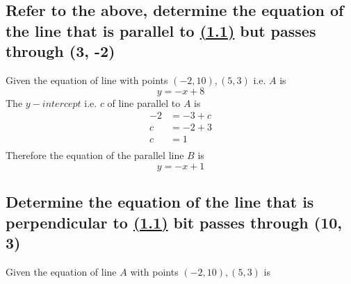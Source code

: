 \documentclass{article}
\begin{document}
\subsection{Refer to the above, determine the equation of the line that is parallel to \hyperref[subsection:1.1]{(1.1)} but passes through (3, -2)}

Given the equation of line with points $(-2, 10),(5, 3)$ i.e. $A$ is
$$
    y = -x + 8
$$
The $y-intercept$ i.e. $c$ of line parallel to $A$ is
$$
    \begin{aligned}
        -2 & = -3 + c \\
        c  & = -2 + 3 \\
        c  & = 1      \\
    \end{aligned}
$$
Therefore the equation of the parallel line $B$ is
$$
    y = -x + 1
$$

\subsection{Determine the equation of the line that is perpendicular to \hyperref[subsection:1.1]{(1.1)} bit passes through (10, 3)}

Given the equation of line $A$ with points $(-2, 10),(5, 3)$ is
\end{document}
